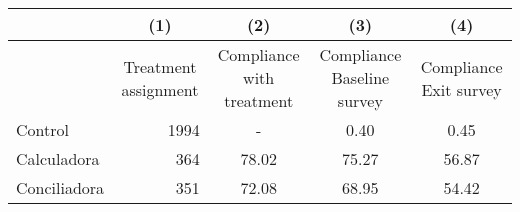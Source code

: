 \begin{tabular}{lrccc}
\toprule
      & \multicolumn{1}{c}{(1)} & (2)   & (3)   & (4) \\
\midrule
      & \multicolumn{1}{c}{Treatment assignment} & Compliance with treatment & Compliance Baseline survey & Compliance Exit survey \\
\midrule
\midrule
Control & 1994  & -     & 0.40  & 0.45 \\
Calculadora  & 364   & 78.02 & 75.27 & 56.87 \\
Conciliadora & 351   & 72.08 & 68.95 & 54.42 \\
\bottomrule
\end{tabular}%
